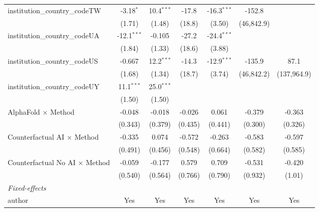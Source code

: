 \begin{tabular}{lcccccc}
   institution\_country\_codeTW          & -3.18$^{*}$   & 10.4$^{***}$  & -17.8         & -16.3$^{***}$ & -152.8       &   \\   
                                         & (1.71)        & (1.48)        & (18.8)        & (3.50)        & (46,842.9)   &   \\   
   institution\_country\_codeUA          & -12.1$^{***}$ & -0.105        & -27.2         & -24.4$^{***}$ &              &   \\   
                                         & (1.84)        & (1.33)        & (18.6)        & (3.88)        &              &   \\   
   institution\_country\_codeUS          & -0.667        & 12.2$^{***}$  & -14.3         & -12.9$^{***}$ & -135.9       & 87.1\\   
                                         & (1.68)        & (1.34)        & (18.7)        & (3.74)        & (46,842.2)   & (137,964.9)\\   
   institution\_country\_codeUY          & 11.1$^{***}$  & 25.0$^{***}$  &               &               &              &   \\   
                                         & (1.50)        & (1.50)        &               &               &              &   \\   
   AlphaFold $\times$ Method             & -0.048        & -0.018        & -0.026        & 0.061         & -0.379       & -0.363\\   
                                         & (0.343)       & (0.379)       & (0.435)       & (0.441)       & (0.300)      & (0.326)\\   
   Counterfactual AI $\times$ Method     & -0.335        & 0.074         & -0.572        & -0.263        & -0.583       & -0.597\\   
                                         & (0.491)       & (0.456)       & (0.548)       & (0.664)       & (0.582)      & (0.585)\\   
   Counterfactual No AI $\times$ Method  & -0.059        & -0.177        & 0.579         & 0.709         & -0.531       & -0.420\\   
                                         & (0.540)       & (0.564)       & (0.766)       & (0.790)       & (0.932)      & (1.01)\\   
   \midrule
   \emph{Fixed-effects}\\
   author                                & Yes           & Yes           & Yes           & Yes           & Yes          & Yes\\  

\end{tabular}
